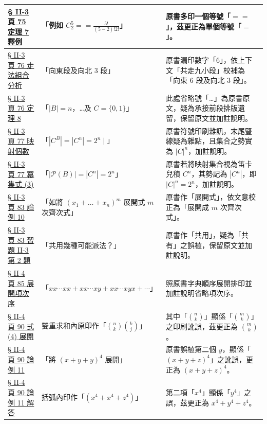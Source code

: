 \documentclass[a4paper,12pt,twoside]{article}
\begin{document}
\begin{xltabular}{\textwidth}{|p{3.2cm}|p{3.8cm}|X|}
\hyperref[note:b5-ch2-p75-eq]{§ II-3 頁 75 定理 7 釋例} & 
「例如 $C_2^5 == \frac{5!}{(5-2)! 2!}$」 & 
原書多印一個等號「$==$」，茲更正為單個等號「$=$」。 \\ \hline

\hyperref[note:b5-ch2-p76-east6]{§ II-3 頁 76 走法組合分析} & 
「向東段及向北 3 段」 & 
原書漏印數字「6」，依上下文「共走九小段」校補為「向東 6 段及向北 3 段」。 \\ \hline

\hyperref[note:b5-ch2-p76-thm8-dots]{§ II-3 頁 76 定理 8} & 
「$|B| = n$，\dots 及 $C = \{0, 1\}$」 & 
此處省略號「\dots」為原書原文，疑為承接前段排版遺留，保留原文並加註說明。 \\ \hline

\hyperref[note:b5-ch2-p77-cb]{§ II-3 頁 77 映射個數} & 
「$|C^B| = |C^n| = 2^n \mid$」 & 
原書符號印刷雜訊，末尾豎線疑為雜點，且集合之勢實為 $|C|^n$，加註說明。 \\ \hline

\hyperref[note:b5-ch2-p77-pn]{§ II-3 頁 77 冪集式 (3)} & 
「$|\mathscr{P}(B)| = |C^n| = 2^n$」 & 
原書若將映射集合視為笛卡兒積 $C^n$，其勢記為 $|C^n|$，即 $|C|^n = 2^n$，加註說明。 \\ \hline

\hyperref[note:b5-ch2-p83-zhankai]{§ II-3 頁 83 論例 10} & 
「如將 $(x_1 + \dots + x_n)^m$ 展開式 $m$ 次齊次式」 & 
原書作「展開式」，依文意校正為「展開成 $m$ 次齊次式」。 \\ \hline

\hyperref[note:b5-ch2-p83-gongyong]{§ II-3 頁 83 習題 II-3 第 2 題} & 
「共用幾種可能派法？」 & 
原書作「共用」，疑為「共有」之誤植，保留原文並加註說明。 \\ \hline

\hyperref[note:b5-ch2-p85-expand]{§ II-4 頁 85 展開項次序} & 
「$xx\cdots xx + xx\cdots xy + xx\cdots xyx + \cdots$」 & 
照原書字典順序展開排印並加註說明省略項次序。 \\ \hline

\hyperref[note:b5-ch2-p90-binom]{§ II-4 頁 90 式 (4) 展開} & 
雙重求和內原印作「$\binom{n}{k} \binom{k}{j}$」 & 
其中「$\binom{n}{k}$」顯係「$\binom{m}{k}$」之印刷訛誤，茲更正為 $\binom{m}{k}$。 \\ \hline

\hyperref[note:b5-ch2-p90-ex11-typo]{§ II-4 頁 90 論例 11} & 
「將 $(x+y+y)^4$ 展開」 & 
原書誤植第二個 $y$，顯係「$(x+y+z)^4$」之訛誤，更正為 $(x+y+z)^4$。 \\ \hline

\hyperref[note:b5-ch2-p90-ex11-y4]{§ II-4 頁 90 論例 11 解答} & 
括弧內印作「$(x^4 + x^4 + z^4)$」 & 
第二項「$x^4$」顯係「$y^4$」之誤，茲更正為 $x^4 + y^4 + z^4$。 \\ \hline


\end{xltabular}
\end{document}
